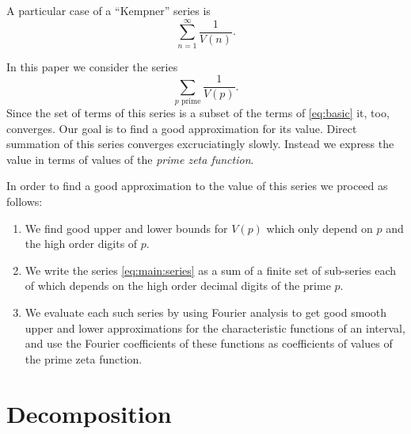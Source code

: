 \documentclass{article}
\begin{document}
A particular case of a ``Kempner'' series is
\begin{displaymath}
  \sum_{n=1}^\infty \frac{1}{V(n)}.
\end{displaymath}
 
In this paper we consider the series
\begin{equation}
  \label{eq:main:series}
  \sum_{p \text{ prime}} \frac{1}{V(p)}.
\end{equation}
Since the set of terms of this series is a subset of the terms of
\eqref{eq:basic} it, too, converges. Our goal is to find a good
approximation for its value. Direct summation of this series converges
excruciatingly slowly. Instead we express the value in terms of values
of the \emph{prime zeta function}.

In order to find a good approximation to the value of this series we
proceed as follows:

\begin{enumerate}
\item We find good upper and lower bounds for $V(p)$ which only depend
  on $p$ and the high order digits of $p$.
\item We write the series \eqref{eq:main:series} as a sum of a finite
  set of sub-series
  each of which depends on the high order decimal digits of the prime
  $p$.
\item We evaluate each such series by using Fourier analysis to get
  good smooth upper and lower approximations for the characteristic
  functions of an interval, and use the Fourier coefficients of these
  functions as coefficients of values of the prime zeta function.
\end{enumerate}
\section{Decomposition}
\label{sec:decomp}
\end{document}
